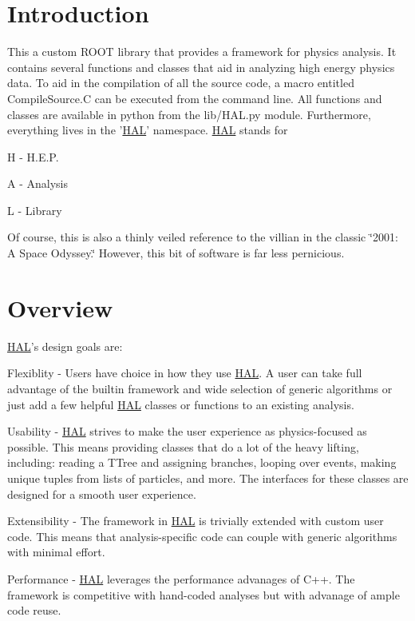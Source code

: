 \hypertarget{index_intro_sec}{}\section{Introduction}\label{index_intro_sec}
This a custom R\-O\-O\-T library that provides a framework for physics analysis. It contains several functions and classes that aid in analyzing high energy physics data. To aid in the compilation of all the source code, a macro entitled {\ttfamily Compile\-Source.\-C} can be executed from the command line. All functions and classes are available in python from the {\ttfamily lib/\-H\-A\-L.\-py} module. Furthermore, everything lives in the '\hyperlink{namespace_h_a_l}{H\-A\-L}' namespace. \hyperlink{namespace_h_a_l}{H\-A\-L} stands for\par
 H -\/ H.\-E.\-P.\par
 A -\/ Analysis\par
 L -\/ Library\par
 Of course, this is also a thinly veiled reference to the villian in the classic \char`\"{}2001\-: A Space Odyssey.\char`\"{} However, this bit of software is far less pernicious.\hypertarget{index_overview_sec}{}\section{Overview}\label{index_overview_sec}
\hyperlink{namespace_h_a_l}{H\-A\-L}'s design goals are\-:\par
 Flexiblity -\/ Users have choice in how they use \hyperlink{namespace_h_a_l}{H\-A\-L}. A user can take full advantage of the builtin framework and wide selection of generic algorithms or just add a few helpful \hyperlink{namespace_h_a_l}{H\-A\-L} classes or functions to an existing analysis.\par
 Usability -\/ \hyperlink{namespace_h_a_l}{H\-A\-L} strives to make the user experience as physics-\/focused as possible. This means providing classes that do a lot of the heavy lifting, including\-: reading a T\-Tree and assigning branches, looping over events, making unique tuples from lists of particles, and more. The interfaces for these classes are designed for a smooth user experience.\par
 Extensibility -\/ The framework in \hyperlink{namespace_h_a_l}{H\-A\-L} is trivially extended with custom user code. This means that analysis-\/specific code can couple with generic algorithms with minimal effort.\par
 Performance -\/ \hyperlink{namespace_h_a_l}{H\-A\-L} leverages the performance advanages of C++. The framework is competitive with hand-\/coded analyses but with advanage of ample code reuse.\par
 